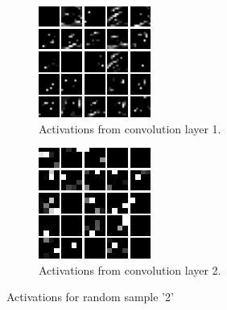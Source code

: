 \documentclass{article}
\begin{document}
\begin{figure}[h!]
\begin{subfigure}[t]{0.3\textwidth}
        \includegraphics[width=\textwidth]{./plots/activation2_1.png}
        \caption{Activations from convolution layer 1.}
        \label{fig:subfig18b}
    \end{subfigure}
    \hfill
    \begin{subfigure}[t]{0.3\textwidth}
        \centering
        \includegraphics[width=\textwidth]{./plots/activation2_2.png}
        \caption{Activations from convolution layer 2.}
        \label{fig:subfig18c}
    \end{subfigure}
    \caption{Activations for random sample '2'}
    \label{fig:plot18}
\end{figure}
\end{document}

